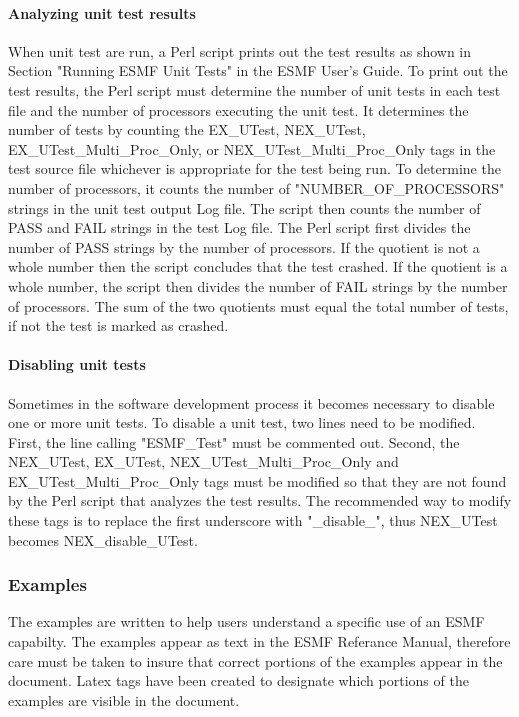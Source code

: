 \paragraph{Analyzing unit test results }
When unit test are run, a Perl script prints out the test results as shown in
Section "Running ESMF Unit Tests" in the ESMF User's Guide. To print out the test results,
the Perl script must determine the number of unit tests in each test file and the number of
processors executing the unit test. It determines the number of tests by counting the
EX\_UTest, NEX\_UTest, EX\_UTest\_Multi\_Proc\_Only, or NEX\_UTest\_Multi\_Proc\_Only 
tags in the test source file whichever is appropriate for the test being run. 
To determine the number of processors, it counts the number of "NUMBER\_OF\_PROCESSORS" strings in the
unit test output Log file. The script then counts the number of PASS and FAIL strings in the
test Log file.
The Perl script first divides the number of PASS strings by the number of processors. If the
quotient is not a whole  number then the script concludes that the test crashed. If the quotient
is a whole number, the script then divides the number of FAIL strings by the number of processors.
The sum of the two quotients must equal the total number of tests, if not the test is marked
as crashed.



\paragraph{Disabling unit tests }
Sometimes in the software development process it becomes necessary to disable one or more unit tests.
To disable a unit test, two lines need to be modified. First, the line calling "ESMF\_Test" must be commented out.
Second, the NEX\_UTest, EX\_UTest, NEX\_UTest\_Multi\_Proc\_Only and EX\_UTest\_Multi\_Proc\_Only tags must be modified
so that they are not found by the Perl script that analyzes the test results.
The recommended way to modify these tags is to replace the first underscore with "\_disable\_", thus NEX\_UTest becomes
NEX\_disable\_UTest. 

\subsubsection{Examples}
The examples are written to help users understand a specific use of an
ESMF capabilty. The examples appear as text in the ESMF Referance Manual, therefore
care must be taken to insure that correct portions of the examples appear in the
document. Latex tags have been created to designate which portions of the
examples are visible in the document. 


